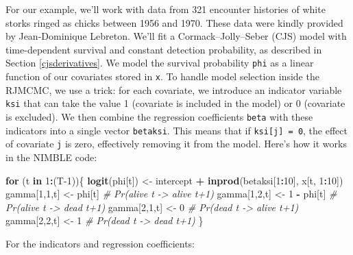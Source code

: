 \documentclass[
  12pt,
]{krantz}
\newenvironment{Shaded}{\begin{snugshade}}{\end{snugshade}}
\newcommand{\CommentTok}[1]{\textcolor[rgb]{0.56,0.35,0.01}{\textit{#1}}}
\newcommand{\ControlFlowTok}[1]{\textcolor[rgb]{0.13,0.29,0.53}{\textbf{#1}}}
\newcommand{\DecValTok}[1]{\textcolor[rgb]{0.00,0.00,0.81}{#1}}
\newcommand{\FunctionTok}[1]{\textcolor[rgb]{0.13,0.29,0.53}{\textbf{#1}}}
\newcommand{\NormalTok}[1]{#1}
\newcommand{\OtherTok}[1]{\textcolor[rgb]{0.56,0.35,0.01}{#1}}
\newcommand{\SpecialCharTok}[1]{\textcolor[rgb]{0.81,0.36,0.00}{\textbf{#1}}}
\begin{document}
For our example, we'll work with data from 321 encounter histories of white storks ringed as chicks between 1956 and 1970. These data were kindly provided by Jean-Dominique Lebreton. We'll fit a Cormack--Jolly--Seber (CJS) model with time-dependent survival and constant detection probability, as described in Section \ref{cjsderivatives}. We model the survival probability \texttt{phi} as a linear function of our covariates stored in \texttt{x}. To handle model selection inside the RJMCMC, we use a trick: for each covariate, we introduce an indicator variable \texttt{ksi} that can take the value 1 (covariate is included in the model) or 0 (covariate is excluded). We then combine the regression coefficients \texttt{beta} with these indicators into a single vector \texttt{betaksi}. This means that if \texttt{ksi{[}j{]}\ =\ 0}, the effect of covariate \texttt{j} is zero, effectively removing it from the model. Here's how it works in the NIMBLE code:

\begin{Shaded}
\begin{Highlighting}[]
\ControlFlowTok{for}\NormalTok{ (t }\ControlFlowTok{in} \DecValTok{1}\SpecialCharTok{:}\NormalTok{(T}\DecValTok{{-}1}\NormalTok{))\{}
  \FunctionTok{logit}\NormalTok{(phi[t]) }\OtherTok{\textless{}{-}}\NormalTok{ intercept }\SpecialCharTok{+} \FunctionTok{inprod}\NormalTok{(betaksi[}\DecValTok{1}\SpecialCharTok{:}\DecValTok{10}\NormalTok{], x[t, }\DecValTok{1}\SpecialCharTok{:}\DecValTok{10}\NormalTok{])}
\NormalTok{  gamma[}\DecValTok{1}\NormalTok{,}\DecValTok{1}\NormalTok{,t] }\OtherTok{\textless{}{-}}\NormalTok{ phi[t]      }\CommentTok{\# Pr(alive t {-}\textgreater{} alive t+1)}
\NormalTok{  gamma[}\DecValTok{1}\NormalTok{,}\DecValTok{2}\NormalTok{,t] }\OtherTok{\textless{}{-}} \DecValTok{1} \SpecialCharTok{{-}}\NormalTok{ phi[t]  }\CommentTok{\# Pr(alive t {-}\textgreater{} dead t+1)}
\NormalTok{  gamma[}\DecValTok{2}\NormalTok{,}\DecValTok{1}\NormalTok{,t] }\OtherTok{\textless{}{-}} \DecValTok{0}           \CommentTok{\# Pr(dead t {-}\textgreater{} alive t+1)}
\NormalTok{  gamma[}\DecValTok{2}\NormalTok{,}\DecValTok{2}\NormalTok{,t] }\OtherTok{\textless{}{-}} \DecValTok{1}           \CommentTok{\# Pr(dead t {-}\textgreater{} dead t+1)}
\NormalTok{\}}
\end{Highlighting}
\end{Shaded}

For the indicators and regression coefficients:
\end{document}
